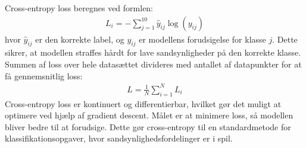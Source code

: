 \documentclass{article}
\begin{document}
Cross-entropy loss beregnes ved formlen:
\begin{align}
L_i = -\sum_{j=1}^{10} \hat{y}_{ij} \log(y_{ij})
\end{align}
hvor $ \hat{y}_{ij} $ er den korrekte label, og $ y_{ij} $ er modellens forudsigelse for klasse $ j $. Dette sikrer, at modellen straffes hårdt for lave sandsynligheder på den korrekte klasse. Summen af loss over hele datasættet divideres med antallet af datapunkter for at få gennemsnitlig loss:
\begin{align}
L = \frac{1}{N} \sum_{i=1}^{N} L_i
\end{align}
Cross-entropy loss er kontinuert og differentierbar, hvilket gør det muligt at optimere ved hjælp af gradient descent. Målet er at minimere loss, så modellen bliver bedre til at forudsige. Dette gør cross-entropy til en standardmetode for klassifikationsopgaver, hvor sandsynlighedsfordelinger er i spil. \parencite{Kumar_2024,verma2020neuralnet}
\end{document}
